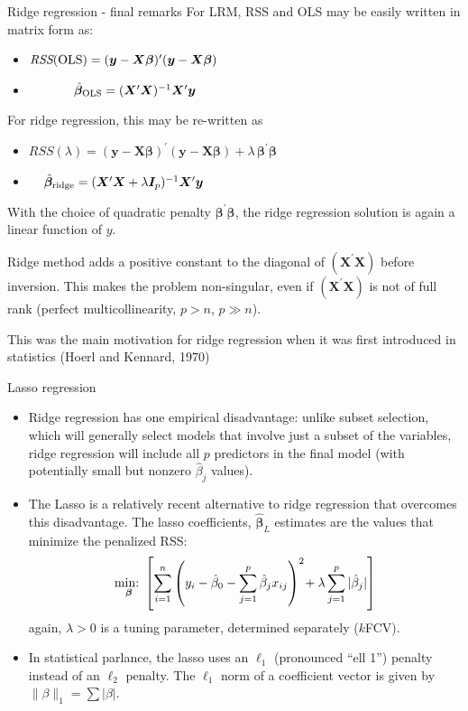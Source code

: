 \documentclass{beamer}
\begin{document}
\begin{frame}{Ridge regression - final remarks}
For LRM, RSS and OLS may be easily written in matrix form as:
\begin{itemize}
\item $\textit{RSS}(\textnormal{OLS}) = (\bm{y}-\bm{X\beta})^{\prime}(\bm{y}-\bm{X\beta})$
\item ~~~~~~~$\hat{\bm{\beta}}_{\textnormal{OLS}} = (\bm{X}^{\prime}\bm{X})^{-1}\bm{X}^{\prime}\bm{y}$ 
\end{itemize}
For ridge regression, this may be re-written as
\begin{itemize}
\item $\textit{RSS}(\lambda) = (\bm{y}-\bm{X\beta})^{\prime}(\bm{y}-\bm{X\beta}) 
+ \lambda \,\bm{\beta}^{\prime} \!\bm{\beta}$
\item ~~$\,\hat{\bm{\beta}}_{\textnormal{ridge}} = (\bm{X}^{\prime}\bm{X} + \lambda \bm{I}_p )^{-1}\bm{X}^{\prime}\bm{y}$ 
\end{itemize}

With the choice of quadratic penalty $\bm{\beta}^{\prime} \!\bm{\beta}$, the ridge regression solution is again a linear function of $y$. 

\medskip
Ridge method adds a positive constant to the diagonal of $(\bm{X}^{\prime}\bm{X})$ before inversion. This makes the problem non-singular, even if $(\bm{X}^{\prime}\bm{X})$ is not of full rank (perfect multicollinearity, $p>n$, $p \gg n$).

\medskip
This was the main motivation for ridge regression when it was first introduced in statistics (Hoerl and Kennard, 1970)

\end{frame}
\begin{frame}{Lasso regression}
\begin{itemize}
\item Ridge regression has one empirical disadvantage:
unlike subset selection, which will generally select models
that involve just a subset of the variables, ridge regression
will include all $p$ predictors in the final model (with potentially small but nonzero $\hat{\beta}_{j}$ values).
\medskip
\item The Lasso is a relatively recent alternative to ridge
regression that overcomes this disadvantage. The lasso
coefficients,  $\bm{\hat{\beta}}_{\!L}$ estimates 
are the values that minimize the penalized RSS:
$$
\underset{\bm{\beta}}{\textnormal{min:~}} 
\left[
\sum_{i=1}^n \left(y_i - \hat{\beta}_0 
- \sum_{j=1}^p  \hat{\beta}_j x_{ij} \right)^2 
\! + \lambda \sum_{j=1}^p  | \hat{\beta}_j | \right]$$
again, $\lambda > 0$ is a tuning parameter, determined separately ($k$FCV).
\item In statistical parlance, the lasso uses an $\ell_1$ (pronounced ``ell 1'') penalty instead of an $\ell_2$ penalty. The $\ell_1$ norm of a coefficient vector  is given by 
$\| \beta \|_1 = \sum | \beta |$.
\end{itemize}
\end{frame}
\end{document}
